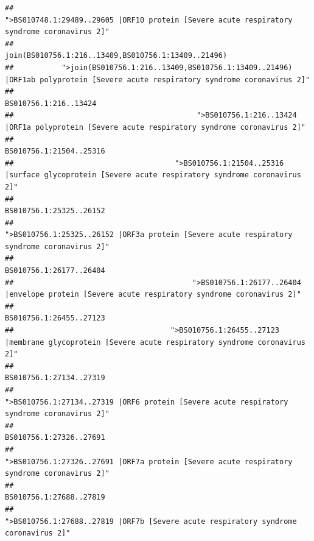 \documentclass[
]{article}
\begin{document}
\begin{verbatim}
##                                            ">BS010748.1:29489..29605 |ORF10 protein [Severe acute respiratory syndrome coronavirus 2]" 
##                                                                                    join(BS010756.1:216..13409,BS010756.1:13409..21496) 
##           ">join(BS010756.1:216..13409,BS010756.1:13409..21496) |ORF1ab polyprotein [Severe acute respiratory syndrome coronavirus 2]" 
##                                                                                                                  BS010756.1:216..13424 
##                                          ">BS010756.1:216..13424 |ORF1a polyprotein [Severe acute respiratory syndrome coronavirus 2]" 
##                                                                                                                BS010756.1:21504..25316 
##                                     ">BS010756.1:21504..25316 |surface glycoprotein [Severe acute respiratory syndrome coronavirus 2]" 
##                                                                                                                BS010756.1:25325..26152 
##                                            ">BS010756.1:25325..26152 |ORF3a protein [Severe acute respiratory syndrome coronavirus 2]" 
##                                                                                                                BS010756.1:26177..26404 
##                                         ">BS010756.1:26177..26404 |envelope protein [Severe acute respiratory syndrome coronavirus 2]" 
##                                                                                                                BS010756.1:26455..27123 
##                                    ">BS010756.1:26455..27123 |membrane glycoprotein [Severe acute respiratory syndrome coronavirus 2]" 
##                                                                                                                BS010756.1:27134..27319 
##                                             ">BS010756.1:27134..27319 |ORF6 protein [Severe acute respiratory syndrome coronavirus 2]" 
##                                                                                                                BS010756.1:27326..27691 
##                                            ">BS010756.1:27326..27691 |ORF7a protein [Severe acute respiratory syndrome coronavirus 2]" 
##                                                                                                                BS010756.1:27688..27819 
##                                                    ">BS010756.1:27688..27819 |ORF7b [Severe acute respiratory syndrome coronavirus 2]" 

\end{verbatim}
\end{document}
